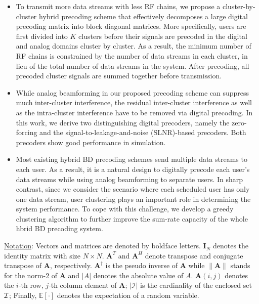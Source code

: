 \documentclass[conference]{IEEEtran}
\begin{document}
\begin{itemize}[leftmargin=*]
\item To transmit more data streams with less RF chains, we propose a cluster-by-cluster hybrid precoding scheme that effectively decomposes a large digital precoding matrix into block diagonal matrices. More specifically, users are first divided into $K$ clusters before their signals are precoded in the digital and analog domains cluster by cluster. As a result, the minimum number of RF chains is constrained by the number of data streams in each cluster, in lieu of the total number of data streams in the system. After precoding, all precoded cluster signals are summed together before transmission.\
\item While analog beamforming in our proposed precoding scheme can suppress much inter-cluster interference, the residual inter-cluster interference as well as the intra-cluster interference have to be removed via digital precoding. In this work, we derive two distinguishing digital precoders, namely the zero-forcing and the signal-to-leakage-and-noise (SLNR)-based precoders. Both precoders show good performance in simulation.
\item Most existing hybrid BD precoding schemes send multiple data streams to each user. As a result, it is a natural design to digitally precode each user's data streams while using analog beamforming to separate users. In sharp contrast, since we consider the scenario where each scheduled user has only one data stream, user clustering plays an important role in determining the system performance. To cope with this challenge, we develop a greedy clustering algorithm to further improve the sum-rate capacity of the whole hbrid BD precoding system.
\end{itemize}


\underline{Notation}: Vectors and matrices are denoted by boldface letters. $\bm{I}_N$ denotes the identity matrix with size $N\times N$. ${\bm A}^T$ and ${\bm A}^H$ denote transpose and conjugate transpose of ${\bm A}$, respectively. $\bm{A}^\dagger$ is the pseudo inverse of $\bm{A}$ while $\|\bm{A}\| $ stands for the norm-2 of ${\bm A}$ and $|A|$ denotes the absolute value of $A$. $\bm{A}(i,j)$ denotes the $i$-th row, $j$-th column element of ${\bm A}$; $|\mathcal{I}|$ is the cardinality of the enclosed set ${\cal I}$; Finally, $\mathbb{E}[\cdot] $ denotes the expectation of a random variable.
\end{document}
